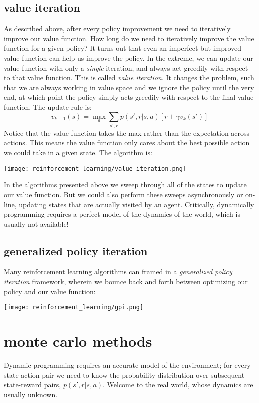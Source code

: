 \subsection{value iteration}
As described above, after every policy improvement we need to iteratively improve our value function. How long do we need to iteratively improve the value function for a given policy? It turns out that even an imperfect but improved value function can help us improve the policy. In the extreme, we can update our value function with only a \textit{single} iteration, and always act greedily with respect to that value function. This is called \textit{value iteration}. It changes the problem, such that we are always working in value space and we ignore the policy until the very end, at which point the policy simply acts greedily with respect to the final value function. The update rule is:
$$
v_{k+1}(s) = \max_a \sum_{s',r} p(s',r|s,a) [r + \gamma v_k(s')]
$$
Notice that the value function takes the max rather than the expectation across actions. This means the value function only cares about the best possible action we could take in a given state. The algorithm is:

\begin{center}\texttt{[image: reinforcement\_learning/value\_iteration.png]}\end{center}

In the algorithms presented above we sweep through all of the states to update our value function. But we could also perform these sweeps asynchronously or on-line, updating states that are actually visited by an agent. Critically, dynamically programming requires a perfect model of the dynamics of the world, which is usually not available!

\subsection{generalized policy iteration}
Many reinforcement learning algorithms can framed in a \textit{generalized policy iteration} framework, wherein we bounce back and forth between optimizing our policy and our value function:

\begin{center}\texttt{[image: reinforcement\_learning/gpi.png]}\end{center}

\section{monte carlo methods}
Dynamic programming requires an accurate model of the environment; for every state-action pair we need to know the probability distribution over subsequent state-reward pairs, $p(s',r|s,a)$. Welcome to the real world, whose dynamics are usually unknown.

